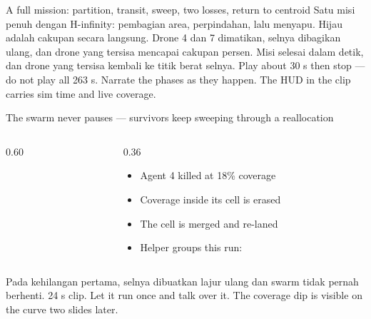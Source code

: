 \documentclass[aspectratio=169,11pt,t]{beamer}
\begin{document}
\begin{frame}{A full mission: partition, transit, sweep, two losses, return to centroid}
  \centering
    {Satu misi penuh dengan H-infinity: pembagian area, perpindahan, lalu menyapu. Hijau adalah cakupan secara langsung. Drone 4 dan 7 dimatikan, selnya dibagikan ulang, dan drone yang tersisa mencapai cakupan \CovRectHinf\space persen. Misi selesai dalam \TmisRectHinf\space detik, dan drone yang tersisa kembali ke titik berat selnya.}
    {Play about 30 s then stop --- do not play all 263 s. Narrate the phases
        as they happen. The HUD in the clip carries sim time and live coverage.}
\end{frame}

\begin{frame}{The swarm never pauses --- survivors keep sweeping through a reallocation}
  \begin{columns}[T,onlytextwidth]
    \begin{column}{0.60\textwidth}
    \end{column}
    \begin{column}{0.36\textwidth}
      \vskip3mm
      \begin{itemize}\bulletgap
        \item Agent 4 killed at 18\% coverage
        \item Coverage inside its cell is erased
        \item The cell is merged and re-laned
        \item Helper groups this run: \HelpersRectHinf
      \end{itemize}
    \end{column}
  \end{columns}
    {Pada kehilangan pertama, selnya dibuatkan lajur ulang dan swarm tidak pernah berhenti.}
    {24 s clip. Let it run once and talk over it. The coverage dip is visible
        on the curve two slides later.}
\end{frame}
\end{document}
